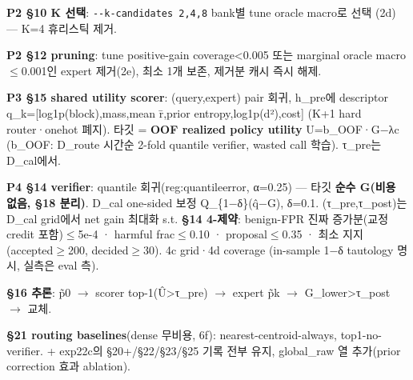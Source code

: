 \par\noindent \textbullet\enspace \textbf{P2 §10 K 선택}: \texttt{-\allowbreak{}-\allowbreak{}k-\allowbreak{}cand\allowbreak{}idates 2\allowbreak{},\allowbreak{}4,\allowbreak{}8} bank별 tune oracle macro로 선택 (2d) — K=\allowbreak{}4 휴리스틱 제거.


\par\noindent \textbullet\enspace \textbf{P2 §12 pruning}: tune positive-gain coverage<0.005 또는 marginal oracle macro\ensuremath{\leq}0.001인 expert 제거(2e), 최소 1개 보존, 제거분 캐시 즉시 해제.


\par\noindent \textbullet\enspace \textbf{P3 §15 shared utility scorer}: (query,expert) pair 회귀, h\_\allowbreak{}pre에 descriptor q\_\allowbreak{}k=\allowbreak{}[log1p(block),mass,mean r̄,prior entropy,log1p(d²),cost] (K+\allowbreak{}1 hard router·onehot 폐지). 타깃 =\allowbreak{} \textbf{OOF realized policy utility} U=\allowbreak{}b\_\allowbreak{}OOF·G−λc (b\_\allowbreak{}OOF: D\_\allowbreak{}route 시간순 2-fold quantile verifier, wasted call 학습). τ\_\allowbreak{}pre는 D\_\allowbreak{}cal에서.


\par\noindent \textbullet\enspace \textbf{P4 §14 verifier}: quantile 회귀(reg:quantileerror, α=\allowbreak{}0.25) — 타깃 \textbf{순수 G(비용 없음, §18 분리)}. D\_\allowbreak{}cal one-sided 보정 Q\_\allowbreak{}\{1−δ\}(q̂−G), δ=\allowbreak{}0.1. (τ\_\allowbreak{}pre,τ\_\allowbreak{}post)는 D\_\allowbreak{}cal grid에서 net gain 최대화 s.t. \textbf{§14 4-제약}: benign-FPR 진짜 증가분(교정 credit 포함)\ensuremath{\leq}5e-4 · harmful frac\ensuremath{\leq}0.10 · proposal\ensuremath{\leq}0.35 · 최소 지지(accepted\ensuremath{\geq}200, decided\ensuremath{\geq}30). 4c grid·4d coverage (in-sample 1−δ tautology 명시, 실측은 eval 측).


\par\noindent \textbullet\enspace \textbf{§16 추론}: p̃0 \ensuremath{\rightarrow} scorer top-1(Û>τ\_\allowbreak{}pre) \ensuremath{\rightarrow} expert p̃k \ensuremath{\rightarrow} G\_\allowbreak{}lower>τ\_\allowbreak{}post \ensuremath{\rightarrow} 교체.


\par\noindent \textbullet\enspace \textbf{§21 routing baselines}(dense 무비용, 6f): nearest-centroid-always, top1-no-verifier. +\allowbreak{} exp22c의 §20+\allowbreak{}/\allowbreak{}§22/\allowbreak{}§23/\allowbreak{}§25 기록 전부 유지, global\_\allowbreak{}raw 열 추가(prior correction 효과 ablation).



